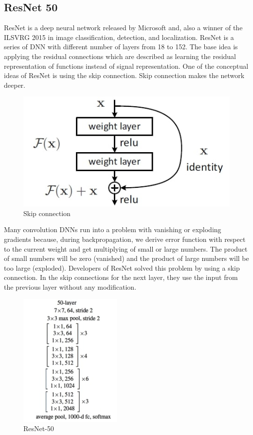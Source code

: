 \documentclass[titlepage]{report}
\begin{document}
\subsection{ResNet 50}
ResNet is a deep neural network released by Microsoft and, also a winner of the ILSVRG 2015 in image classification, detection, and localization. ResNet is a series of DNN with different number of layers from 18 to 152. The base idea is applying the residual connections which are described as learning the residual representation of functions instead of signal representation. One of the conceptual ideas of ResNet is using the skip connection. Skip connection makes the network deeper.  
\begin{figure}[h!]
    \centering
    \includegraphics[scale=0.4]{resnet_1}
    \caption{Skip connection}
\end{figure}

Many convolution DNNs run into a problem with vanishing or exploding gradients because, during backpropagation, we derive error function with respect to the current weight and get multiplying of small or large numbers. The product of small numbers will be zero (vanished) and the product of large numbers will be too large (exploded). Developers of ResNet solved this problem by using a skip connection. In the skip connections for the next layer, they use the input from the previous layer without any modification. 


\begin{figure}
\centering
\includegraphics[scale=0.85]{resnet_2}
\caption{ResNet-50}
\label{fig:resnet_50}
\end{figure}
\end{document}
